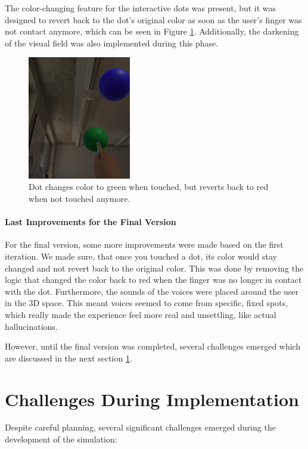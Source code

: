 The color-changing feature for the interactive dots was present, but it was designed to revert back to the dot's original color as soon as the user's finger was not contact anymore, which can be seen in Figure \ref{fig:dot-green}. Additionally, the darkening of the visual field was also implemented during this phase.

\begin{figure}[H]
    \centering
    \includegraphics[width=0.4\textwidth]{../../Figures/dot-color-green.png}
    \caption{Dot changes color to green when touched, but reverts back to red when not touched anymore.}
    \label{fig:dot-green}
\end{figure}

\paragraph{Last Improvements for the Final Version}
For the final version, some more improvements were made based on the first iteration. We made sure, that once you touched a dot, its color would stay changed and not revert back to the original color. This was done by removing the logic that changed the color back to red when the finger was no longer in contact with the dot. Furthermore, the sounds of the voices were placed around the user in the 3D space. This meant voices seemed to come from specific, fixed spots, which really made the experience feel more real and unsettling, like actual hallucinations.

\vspace{1em}

However, until the final version was completed, several challenges emerged which are discussed in the next section \ref{sec:challengesimplementation}.

\section{Challenges During Implementation} 
\label{sec:challengesimplementation}
Despite careful planning, several significant challenges emerged during the development of the simulation:


